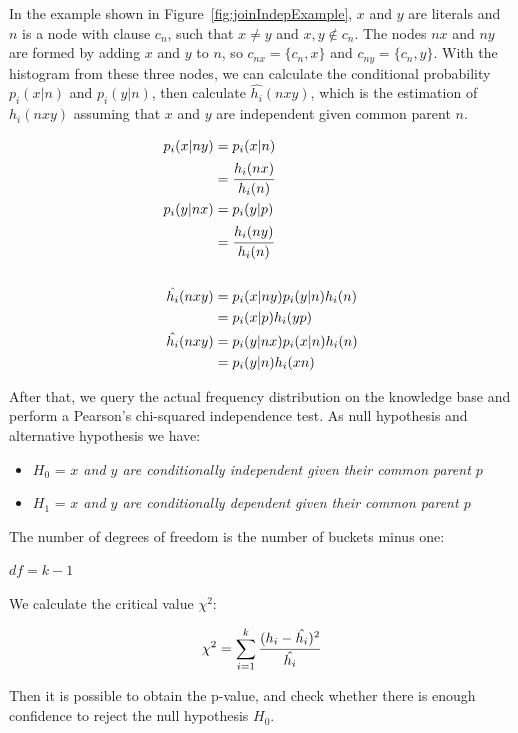 In the example shown in Figure~\ref{fig:joinIndepExample}, $x$ and $y$ are literals and $n$ is a node with clause
$c_n$,
such that $x \neq y$ and $x,y \not \in c_n$. The nodes $nx$ and $ny$ are formed by adding $x$ and $y$ to $n$, so
$c_{nx}=\{c_n,x\}$ and $c_{ny}=\{c_n,y\}$. With the histogram from these three nodes, we can calculate the conditional
probability $p_i(x|n)$ and $p_i(y|n)$, then calculate $\hat{h_i}(nxy)$, which is the estimation of
$h_i(nxy)$ assuming that $x$ and $y$ are independent given common parent $n$.

\begin{align*}
 p_i(x|ny) &= p_i(x|n) \\ 
 &= \cfrac{h_i(nx)}{h_i(n)} \\ 
 p_i(y|nx) &= p_i(y|p) \\ 
 &= \cfrac{h_i(ny)}{h_i(n)} \\ \\ 
 \hat{h_i}(nxy) &= p_i(x|ny)p_i(y|n)h_i(n) \\ 
 &= p_i(x|p)h_i(yp) \\ 
 \hat{h_i}(nxy) &= p_i(y|nx)p_i(x|n)h_i(n) \\ 
 &= p_i(y|n)h_i(xn)
\label{eq:condindep}
\end{align*}

After that, we query the actual frequency distribution on the knowledge base and perform a Pearson's chi-squared
independence test. As null hypothesis and alternative hypothesis we have:

\begin{itemize}
 \item $H_0$ = \emph{$x$ and $y$ are conditionally independent given their common parent $p$}
 \item $H_1$ = \emph{$x$ and $y$ are conditionally dependent given their common parent $p$} 
\end{itemize}

The number of degrees of freedom is the number of buckets minus one:

\begin{center}
 $df=k-1$
\end{center}

We calculate the critical value $\chi^2$:

\begin{equation}
 \chi^2=\sum_{i=1}^{k} \cfrac{(h_i - \hat{h_i})^2}{\hat{h_i}}
\end{equation}

Then it is possible to obtain the p-value, and check whether there is enough confidence to reject the null hypothesis
$H_0$. 

